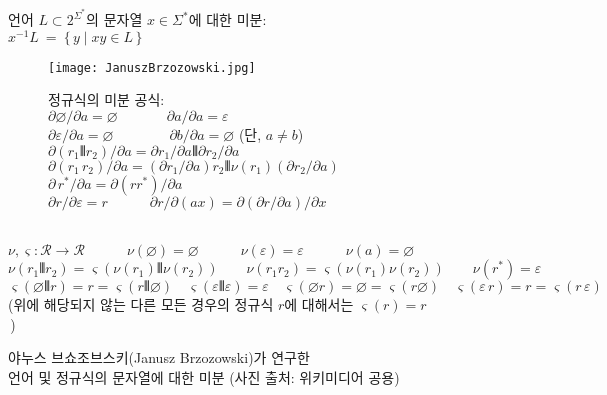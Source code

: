 \begin{figure}\centering
언어 $L\subset2^{\Sigma^{*}}$의 문자열 $x\in\Sigma^{*}$에 대한 미분:~
$x^{-1} L ~=~ \{\,y \mid xy\in L\,\} \qquad ~~ $\\[1.1ex]
\begin{subfigure}{.2\textwidth}
\texttt{[image: JanuszBrzozowski.jpg]}
\end{subfigure}\qquad\quad
\begin{subfigure}{.65\textwidth}
\!\!정규식의 미분 공식:\\[.7ex]
\( \partial\varnothing\!/\partial a = \varnothing \qquad\quad~\;
   \partial a/\partial a = \varepsilon \) \\[.6ex]
\( \partial\varepsilon/\partial a = \varnothing \qquad\qquad
   \partial b/\partial a = \varnothing \) (단, $a\neq b$)\\[.6ex]
\( \partial(r_1\VERT r_2)\!/\partial a = \partial r_1/\partial a \VERT
                                       \partial r_2/\partial a \)\\[.6ex]
\( \partial(r_1\,r_2)\!/\partial a = (\partial r_1/\partial a)r_2 \VERT
                                 \nu(r_1)(\partial r_2/\partial a) \)\\[.6ex]
\( \partial\,r^{*}\!/\partial a = \partial(rr^{*})\!/\partial a \)\\[.8ex]
\( \partial r/\partial \varepsilon = r \qquad\quad
   \partial r/\partial (ax) = \partial (\partial r/\partial a)/\partial x\)
\end{subfigure}\\[1ex]
\( \nu,\varsigma:\mathcal{R}\to\mathcal{R} \qquad\quad
   \nu(\varnothing) = \varnothing \qquad\quad
   \nu(\varepsilon) = \varepsilon \qquad\quad
   \nu(a) = \varnothing \)\qquad$\phantom{A}$\\[.6ex]
\( \nu(r_1\VERT r_2) = \varsigma(\nu(r_1)\VERT\nu(r_2)) \qquad
   \nu(r_1r_2) = \varsigma(\nu(r_1)\nu(r_2)) \qquad
   \nu(r^{*}) = \varepsilon \)\\[1.2ex]
\( \varsigma(\varnothing\VERT r) = r = \varsigma(r \VERT\varnothing) \quad
   \varsigma(\varepsilon\VERT\varepsilon) = \varepsilon \quad
   \varsigma(\varnothing r) = \varnothing = \varsigma(r \varnothing) \quad
   \varsigma(\varepsilon\,r) = r = \varsigma(r\,\varepsilon) \)\\[.7ex]
(위에 해당되지 않는 다른 모든 경우의 정규식 $r$에 대해서는 $\varsigma(r) = r$\,)
\caption{야누스 브쇼조브스키(Janusz Brzozowski)가 연구한 \\
         언어 및 정규식의 문자열에 대한 미분
         {\scriptsize(사진 출처: 위키미디어 공용)}
         \label{fig:Brzozowski}}
\vspace*{-1ex}
\end{figure}

